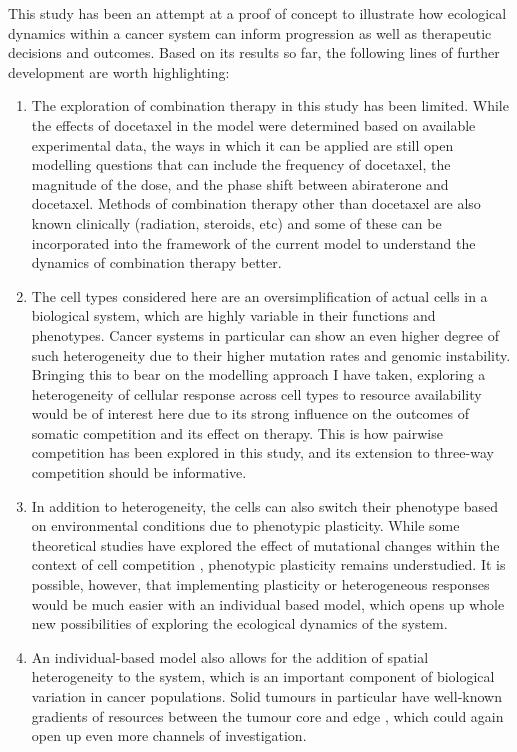 This study has been an attempt at a proof of concept to illustrate how ecological dynamics within a cancer system can inform progression as well as therapeutic decisions and outcomes. Based on its results so far, the following lines of further development are worth highlighting:
\begin{enumerate}
  \item The exploration of combination therapy in this study has been limited. While the effects of docetaxel in the model were determined based on available experimental data, the ways in which it can be applied are still open modelling questions that can include the frequency of docetaxel, the magnitude of the dose, and the phase shift between abiraterone and docetaxel. Methods of combination therapy other than docetaxel are also known clinically (radiation, steroids, etc) and some of these can be incorporated into the framework of the current model to understand the dynamics of combination therapy better.
  \item The cell types considered here are an oversimplification of actual cells in a biological system, which are highly variable in their functions and phenotypes. Cancer systems in particular can show an even higher degree of such heterogeneity due to their higher mutation rates and genomic instability. Bringing this to bear on the modelling approach I have taken, exploring a heterogeneity of cellular response across cell types to resource availability would be of interest here due to its strong influence on the outcomes of somatic competition and its effect on therapy. This is how pairwise competition has been explored in this study, and its extension to three-way competition should be informative.
  \item In addition to heterogeneity, the cells can also switch their phenotype based on environmental conditions due to phenotypic plasticity. While some theoretical studies have explored the effect of mutational changes within the context of cell competition \cite{Snippert}, phenotypic plasticity remains understudied. It is possible, however, that implementing plasticity or heterogeneous responses would be much easier with an individual based model, which opens up whole new possibilities of exploring the ecological dynamics of the system.
  \item An individual-based model also allows for the addition of spatial heterogeneity to the system, which is an important component of biological variation in cancer populations. Solid tumours in particular have well-known gradients of resources between the tumour core and edge \cite{Fontaine}, which could again open up even more channels of investigation.
\end{enumerate}

